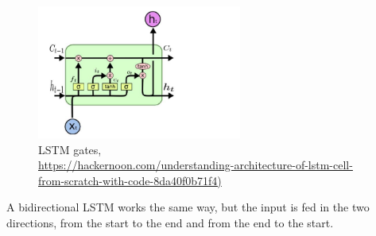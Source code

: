\begin{figure}
 \centering
 \includegraphics[width=0.6\textwidth]{images/chapitre4/LSTM1.jpeg}
 \caption{LSTM gates, \\ \url{https://hackernoon.com/understanding-architecture-of-lstm-cell-from-scratch-with-code-8da40f0b71f4)}}
 \label{fig:chap4:LSTM-gates}
\end{figure} 
A bidirectional LSTM works the same way, but the input is fed in the two directions, from the start to the end and from the end to the start.
